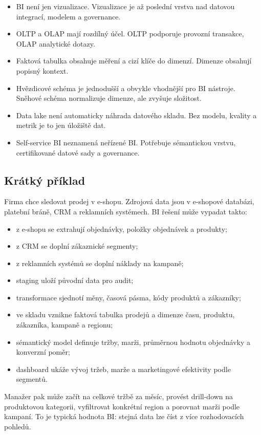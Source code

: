 \pozor
\begin{itemize}
  \item BI není jen vizualizace. Vizualizace je až poslední vrstva nad datovou integrací, modelem a governance.
  \item OLTP a OLAP mají rozdílný účel. OLTP podporuje provozní transakce, OLAP analytické dotazy.
  \item Faktová tabulka obsahuje měření a cizí klíče do dimenzí. Dimenze obsahují popisný kontext.
  \item Hvězdicové schéma je jednodušší a obvykle vhodnější pro BI nástroje. Sněhové schéma normalizuje dimenze, ale zvyšuje složitost.
  \item Data lake není automaticky náhrada datového skladu. Bez modelu, kvality a metrik je to jen úložiště dat.
  \item Self-service BI neznamená neřízené BI. Potřebuje sémantickou vrstvu, certifikované datové sady a governance.
\end{itemize}

\subsection{Krátký příklad}
Firma chce sledovat prodej v e-shopu. Zdrojová data jsou v e-shopové databázi, platební bráně, CRM a reklamních systémech. BI řešení může vypadat takto:
\begin{itemize}
  \item z e-shopu se extrahují objednávky, položky objednávek a produkty;
  \item z CRM se doplní zákaznické segmenty;
  \item z reklamních systémů se doplní náklady na kampaně;
  \item staging uloží původní data pro audit;
  \item transformace sjednotí měny, časová pásma, kódy produktů a zákazníky;
  \item ve skladu vznikne faktová tabulka prodejů a dimenze času, produktu, zákazníka, kampaně a regionu;
  \item sémantický model definuje tržby, marži, průměrnou hodnotu objednávky a konverzní poměr;
  \item dashboard ukáže vývoj tržeb, marže a marketingové efektivity podle segmentů.
\end{itemize}

Manažer pak může začít na celkové tržbě za měsíc, provést drill-down na produktovou kategorii, vyfiltrovat konkrétní region a porovnat marži podle kampaní. To je typická hodnota BI: stejná data lze číst z více rozhodovacích pohledů.

